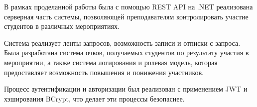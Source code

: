 \conclusion
В рамках проделанной работы была с помощью REST API на .NET реализована серверная часть системы, позволяющей преподавателям контролировать участие студентов в различных мероприятиях.

Система реализует ленты запросов, возможность записи и отписки с запроса. Была разработана система очков, получаемых студентов по результату участия в мероприятии, а также система логирования и ролевая модель, которая предоставляет возможность повышения и понижения участников.

Процесс аутентификации и авторизации был реализован с применением JWT и хэширования BCrypt, что делает эти процессы безопаснее.
